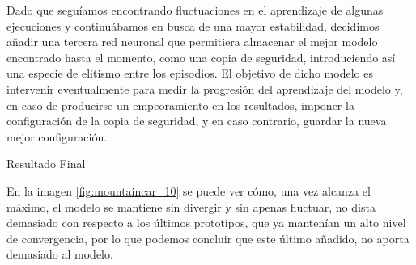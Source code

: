 Dado que seguíamos encontrando fluctuaciones en el aprendizaje de algunas ejecuciones y continuábamos en busca de una mayor estabilidad, decidimos añadir una tercera red neuronal que permitiera almacenar el mejor modelo encontrado hasta el momento, como una copia de seguridad, introduciendo así una especie de elitismo entre los episodios. El objetivo de dicho modelo es intervenir eventualmente para medir la progresión del aprendizaje del modelo y, en caso de producirse un empeoramiento en los resultados, imponer la configuración de la copia de seguridad, y en caso contrario, guardar la nueva mejor configuración. 

%
       {Resultado Final}

En la imagen \ref{fig:mountaincar_10} se puede ver cómo, una vez alcanza el máximo, el modelo se mantiene sin divergir y sin apenas fluctuar, no dista demasiado con respecto a los últimos prototipos, que ya mantenían un alto nivel de convergencia, por lo que podemos concluir que este último añadido, no aporta demasiado al modelo. 

